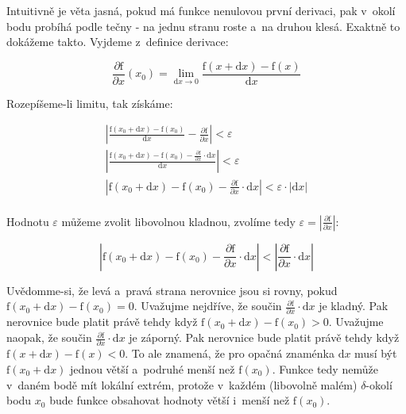 Intuitivně je věta jasná, pokud má funkce nenulovou první derivaci, pak v~okolí bodu probíhá podle tečny - na jednu stranu roste a~na druhou klesá. Exaktně to dokážeme takto. Vyjdeme z~definice derivace:

\begin{equation}
\frac{\partial \mathrm{f}}{\partial x}(x_0) = \lim_{\mathrm{d}x \to 0} \frac{\mathrm{f}(x + \mathrm{d}x) - \mathrm{f}(x)}{\mathrm{d}x}
\end{equation}

Rozepíšeme-li limitu, tak získáme:

\begin{equation}
\begin{split}
\left| \frac{\mathrm{f}(x_0 + \mathrm{d}x) - \mathrm{f}(x_0)}{\mathrm{d}x} - \frac{\partial \mathrm{f}}{\partial x} \right| < \varepsilon \\
\left| \frac{\mathrm{f}(x_0 + \mathrm{d}x) - \mathrm{f}(x_0) - \frac{\partial \mathrm{f}}{\partial x} \cdot \mathrm{d}x}{\mathrm{d}x} \right| < \varepsilon \\
\left| \mathrm{f}(x_0 + \mathrm{d}x) - \mathrm{f}(x_0) - \frac{\partial \mathrm{f}}{\partial x} \cdot \mathrm{d}x \right| < \varepsilon \cdot | \mathrm{d}x | \\
\end{split}
\end{equation}

Hodnotu \(\varepsilon\) můžeme zvolit libovolnou kladnou, zvolíme tedy \(\varepsilon = \left|\frac{\partial \mathrm{f}}{\partial x} \right|\):

\begin{equation}
\left| \mathrm{f}(x_0 + \mathrm{d}x) - \mathrm{f}(x_0) - \frac{\partial \mathrm{f}}{\partial x} \cdot \mathrm{d}x \right| < \left|\frac{\partial \mathrm{f}}{\partial x}  \cdot \mathrm{d}x \right|
\end{equation}

Uvědomme-si, že levá a~pravá strana nerovnice jsou si rovny, pokud \(\mathrm{f}(x_0 + \mathrm{d}x) - \mathrm{f}(x_0) = 0\).
Uvažujme nejdříve, že součin \(\frac{\partial \mathrm{f}}{\partial x} \cdot \mathrm{d}x\) je kladný. Pak nerovnice bude platit právě tehdy když \(\mathrm{f}(x_0 + \mathrm{d}x) - \mathrm{f}(x_0) > 0\). Uvažujme naopak, že součin \(\frac{\partial \mathrm{f}}{\partial x} \cdot \mathrm{d}x\) je záporný. Pak nerovnice bude platit právě tehdy když \(\mathrm{f}(x + \mathrm{d}x) - \mathrm{f}(x) < 0\). To ale znamená, že pro opačná znaménka \(\mathrm{d}x\) musí být \(\mathrm{f}(x_0 + \mathrm{d}x)\) jednou větší a~podruhé menší než \(\mathrm{f}(x_0)\). Funkce tedy nemůže v~daném bodě mít lokální extrém, protože v~každém (libovolně malém) \(\delta\)-okolí bodu \(x_0\) bude funkce obsahovat hodnoty větší i~menší než \(\mathrm{f}(x_0)\).

